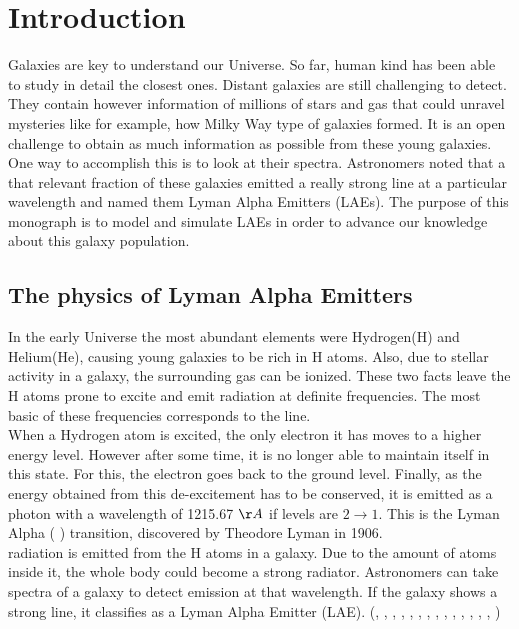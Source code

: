 \setcounter{equation}{0}
\chapter{Introduction}

Galaxies are key to understand our Universe. So far, human kind has been able to study in detail the closest ones. Distant galaxies are still challenging to detect. They contain however information of millions of stars and gas that could unravel mysteries like for example, how Milky Way type of galaxies formed. It is an open challenge to obtain as much information as possible from these young galaxies. One way to accomplish this is to look at their spectra. Astronomers noted that a that relevant fraction of these galaxies emitted a really strong line at a particular wavelength and named them Lyman Alpha Emitters (LAEs). The purpose of this monograph is to model and simulate LAEs in order to advance our knowledge about this galaxy population. \\

\section{The physics of Lyman Alpha Emitters}
\label{sec1:laes}
In the early Universe the most abundant elements were Hydrogen(H) and Helium(He), causing young galaxies to be rich in H atoms. Also, due to stellar activity in a galaxy, the surrounding gas can be ionized. These two facts leave the H atoms prone to excite and emit radiation at definite frequencies. The most basic of these frequencies corresponds to the \lya line. \cite{PartridgePeebles}  \\

When a Hydrogen atom is excited, the only electron it has moves to a higher energy level. However after some time, it is no longer able to maintain itself in this state. For this, the electron goes back to the ground level. Finally, as the energy obtained from this de-excitement has to be conserved, it is emitted as a photon with a wavelength of 1215.67 $\AA$ if levels are $2\rightarrow1$. This is the Lyman Alpha ( \lya) transition, discovered by Theodore Lyman in 1906. \cite{LymanBio} \\

\lya radiation is emitted from the H atoms in a galaxy. Due to the amount of atoms inside it, the whole body could become a strong \lya radiator. Astronomers can take spectra of a galaxy to detect emission at that wavelength. If the galaxy shows a strong \lya line, it classifies as a Lyman Alpha Emitter (LAE). (\cite{DjorgovskiThompson}, \cite{Rhoads00}, \cite{Gawiser2007}, \cite{Koehler2007}, \cite{Ouchi08}, \cite{Yamada2012}, \cite{Schenker2012}, \cite{Kulas12}, \cite{Yamada2012}, \cite{Chonis2013}, \cite{Finkelstein2013}, \cite{Ostlin14}, \cite{Hayes2014}, \cite{Faisst2014}, \cite{Fumagalli2015}) \\

